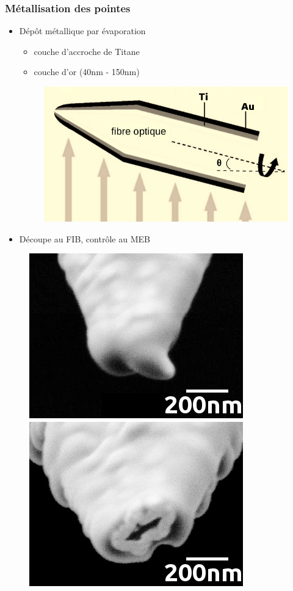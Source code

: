\documentclass[9pt,a9paper,handout]{beamer}
\begin{document}
    \begin{frame}
        \frametitle{Métallisation des pointes}
        \begin{itemize}
            \item Dépôt métallique par évaporation
            \begin{itemize}
                \item couche d'accroche de Titane
                \item couche d'or (40nm - 150nm)
            \end{itemize}
            \vspace*{3mm}
                \begin{figure}[h]\centering
                    \includegraphics[width=.4\textwidth]{Images/Schemas/evaporation_metal}
                \end{figure}

            \item Découpe au FIB, contrôle au MEB
        \end{itemize}
        \begin{figure}[h]\centering
            \includegraphics[width=.25\textwidth]{Images/PhotosPointes/l33fm2_avant_crop}
            \hspace*{3mm}
            \includegraphics[width=.25\textwidth]{Images/PhotosPointes/l33fm2_apres_crop}
        \end{figure}
    \end{frame}
\end{document}
